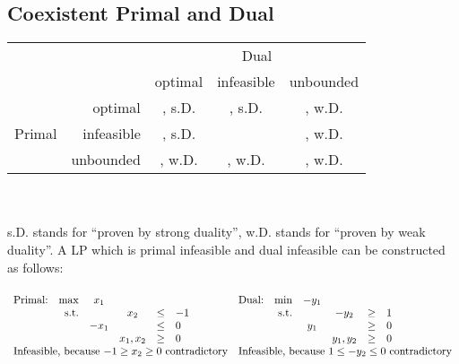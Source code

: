 \subsection{Coexistent Primal and Dual}
\begin{tabular}{lr|ccc|}
			&\multicolumn{1}{l}{}	& \multicolumn{3}{c}{Dual}\\
			&\multicolumn{1}{l}{}	& optimal 		& infeasible		& \multicolumn{1}{c}{unbounded}\\\cline{3-5}
\multirow{3}{*}{Primal}	& optimal		& \checkmark, s.D.	& \texttimes, s.D.	& \texttimes, w.D.\\
			& infeasible		& \texttimes, s.D.	& \checkmark		& \checkmark, w.D.\\
			& unbounded		& \texttimes, w.D.	& \checkmark, w.D.	& \texttimes, w.D.\\\cline{3-5}
\end{tabular}\\\\
s.D. stands for ``proven by strong duality'', w.D. stands for ``proven by weak duality''. A LP which is primal infeasible and dual infeasible can be constructed as follows:\\\\
$
\begin{array}{lrcccl}
\text{Primal:}	& \max		& x_1\\
		& \text{s.t.}	& 	& x_2	& \leq	& -1\\
		&		& -x_1	&	& \leq	& 0\\
		&		&	&x_1,x_2& \geq	& 0\\
\multicolumn{6}{l}{\text{Infeasible, because $-1 \geq x_2 \geq 0$ contradictory}}
\end{array}
\begin{array}{lrcccl}
\text{Dual:}	& \min		& -y_1\\
		& \text{s.t.}	& 	& -y_2	& \geq	& 1\\
		&		&  y_1	&	& \geq	& 0\\
		&		&	&y_1,y_2& \geq	& 0\\
\multicolumn{6}{l}{\text{Infeasible, because $1 \leq -y_2 \leq 0$ contradictory}}
\end{array}
$
